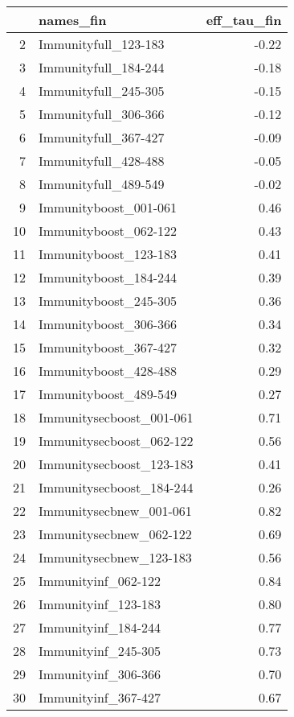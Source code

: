 \begin{table}[ht]
\centering
\begin{tabular}{rlr}
  \hline
 & names\_fin & eff\_tau\_fin \\ 
  \hline
2 & Immunityfull\_123-183 & -0.22 \\ 
  3 & Immunityfull\_184-244 & -0.18 \\ 
  4 & Immunityfull\_245-305 & -0.15 \\ 
  5 & Immunityfull\_306-366 & -0.12 \\ 
  6 & Immunityfull\_367-427 & -0.09 \\ 
  7 & Immunityfull\_428-488 & -0.05 \\ 
  8 & Immunityfull\_489-549 & -0.02 \\ 
  9 & Immunityboost\_001-061 & 0.46 \\ 
  10 & Immunityboost\_062-122 & 0.43 \\ 
  11 & Immunityboost\_123-183 & 0.41 \\ 
  12 & Immunityboost\_184-244 & 0.39 \\ 
  13 & Immunityboost\_245-305 & 0.36 \\ 
  14 & Immunityboost\_306-366 & 0.34 \\ 
  15 & Immunityboost\_367-427 & 0.32 \\ 
  16 & Immunityboost\_428-488 & 0.29 \\ 
  17 & Immunityboost\_489-549 & 0.27 \\ 
  18 & Immunitysecboost\_001-061 & 0.71 \\ 
  19 & Immunitysecboost\_062-122 & 0.56 \\ 
  20 & Immunitysecboost\_123-183 & 0.41 \\ 
  21 & Immunitysecboost\_184-244 & 0.26 \\ 
  22 & Immunitysecbnew\_001-061 & 0.82 \\ 
  23 & Immunitysecbnew\_062-122 & 0.69 \\ 
  24 & Immunitysecbnew\_123-183 & 0.56 \\ 
  25 & Immunityinf\_062-122 & 0.84 \\ 
  26 & Immunityinf\_123-183 & 0.80 \\ 
  27 & Immunityinf\_184-244 & 0.77 \\ 
  28 & Immunityinf\_245-305 & 0.73 \\ 
  29 & Immunityinf\_306-366 & 0.70 \\ 
  30 & Immunityinf\_367-427 & 0.67 \\ 

\end{tabular}
\end{table}
